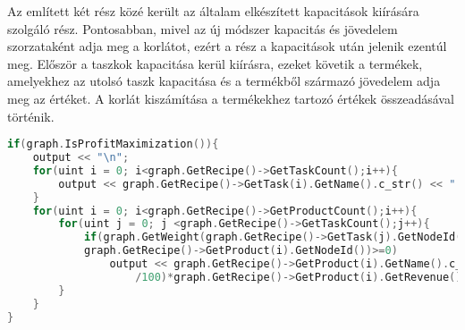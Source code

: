 Az említett két rész közé került az általam elkészített kapacitások kiírására szolgáló rész.
Pontosabban, mivel az új módszer kapacitás és jövedelem szorzataként adja meg a korlátot, ezért a rész a kapacitások után jelenik ezentúl meg.
Először a taszkok kapacitása kerül kiírásra, ezeket követik a termékek, amelyekhez az utolsó taszk kapacitása és a termékből származó jövedelem adja meg az értéket.
A korlát kiszámítása a termékekhez tartozó értékek összeadásával történik.

\begin{lstlisting}[caption={Fájlba írást végző függvény új része},language=c++,numbers=none]
if(graph.IsProfitMaximization()){
	output << "\n";
	for(uint i = 0; i<graph.GetRecipe()->GetTaskCount();i++){
		output << graph.GetRecipe()->GetTask(i).GetName().c_str() << ": " << 		graph.GetTaskCapacity(i) << "\n";
    }
	for(uint i = 0; i<graph.GetRecipe()->GetProductCount();i++){
		for(uint j = 0; j <graph.GetRecipe()->GetTaskCount();j++){
			if(graph.GetWeight(graph.GetRecipe()->GetTask(j).GetNodeId(),
			graph.GetRecipe()->GetProduct(i).GetNodeId())>=0)
				output << graph.GetRecipe()->GetProduct(i).GetName().c_str() << ": " << (graph.GetTaskCapacity(j)*graph.GetRecipe()->GetProduct(i).GetPPercent()
                    /100)*graph.GetRecipe()->GetProduct(i).GetRevenue()<< "\n";
		}
	}
}
\end{lstlisting}